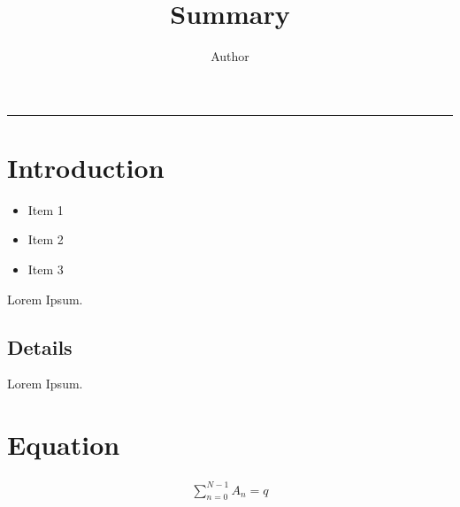 \documentclass[11pt, oneside]{article}   	%
\title{Summary}
\author{Author}
\date{}							%
\begin{document}
\twocolumn
\maketitle
\tableofcontents
\noindent\rule{0.5\textwidth}{0.5pt}

\section{Introduction}
\begin{itemize}
	\item Item 1
	\item Item 2
	\item Item 3 
\end{itemize}
Lorem Ipsum.
\subsection{Details}
Lorem Ipsum.
\section{Equation}
\begin{align}
	\sum_{n=0}^{N-1} A_n = q
\end{align}
\end{document}
